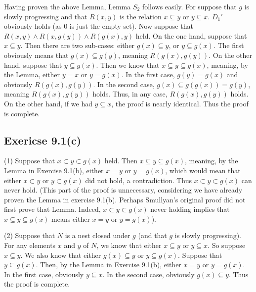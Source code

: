 \documentclass{article}
\theoremstyle{definition}
\begin{document}
Having proven the above Lemma, Lemma $S_2$ follows easily. For suppose that $g$ is slowly progressing and that $R(x,y)$ is the relation 
$x\subseteq y$ or $y\subseteq x$. $D_1'$ obviously holds (as $0$ is just the empty set). Now suppose that 
$R(x,y)\wedge R(x,g(y))\wedge R(g(x),y)$ held. On the one hand, suppose that $x\subseteq y$. Then there are two sub-cases: either $g(x)\subseteq y$, or $y\subseteq g(x)$. The first 
obviously means that $g(x)\subseteq g(y)$, meaning $R(g(x),g(y))$. On the other hand, suppose that $y\subseteq g(x)$. Then we know that $x\subseteq y\subseteq g(x)$, meaning, by the Lemma, 
either $y=x$ or $y=g(x)$. In the first case, $g(y)=g(x)$ and obviously $R(g(x),g(y))$. In the second case, $g(x)\subseteq g(g(x))=g(y)$, meaning $R(g(x),g(y))$ holds. Thus, in any case, 
$R(g(x),g(y))$ holds. On the other hand, if we had $y\subseteq x$, the proof is nearly identical. Thus the proof is complete. 

\subsection*{Exericse 9.1(c)}
(1) Suppose that $x\subset y\subset g(x)$ held. Then $x\subseteq y\subseteq g(x)$, meaning, by the Lemma in Exercise 9.1(b), either $x=y$ or $y=g(x)$, which would mean that either 
$x\subset y$ or $y\subset g(x)$ did not hold, a contradiction. Thus $x\subset y\subset g(x)$ can never hold. (This part of the proof is unnecessary, considering we have already proven the 
Lemma in exercise 9.1(b). Perhaps Smullyan's original proof did not first prove that Lemma. Indeed, $x\subset y\subset g(x)$ never holding implies that 
$x\subseteq y\subseteq g(x)$ means either $x=y$ or $y=g(x)$).

(2) Suppose that $N$ is a nest closed under $g$ (and that $g$ is slowly progressing). For any elements $x$ and $y$ of $N$, we know that either $x\subseteq y$ or $y\subseteq x$. So suppose 
$x\subseteq y$. We also know that either $g(x)\subseteq y$ or $y\subseteq g(x)$. Suppose that $y\subseteq g(x)$. Then, by the Lemma in Exercise 9.1(b), either $x=y$ or $y=g(x)$. In the first 
case, obviously $y\subseteq x$. In the second case, obviously $g(x)\subseteq y$. Thus the proof is complete.
\end{document}
